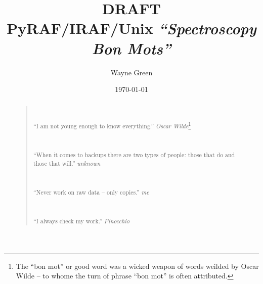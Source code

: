 \documentclass[letter,11pt,oneside]{article}
\begin{document}

\pagecolor{yellow}

\title{\vspace{2.5cm}
{\huge DRAFT} \\
PyRAF/IRAF/Unix \emph{``Spectroscopy Bon Mots''}\\
{\color{darkred}{Now! With Community 2.17 and PyRAF 3}}}
\author{\vspace{-0.5cm} Wayne Green}
\date{\vspace{-0.5cm} \today}
\maketitle


\begin{abstract}
{\color{darkgreen}
\begin{quote}
~


``I am not young enough to know everything.'' {\small \emph{Oscar
    Wilde}\footnote{The ``bon mot'' or good word was a wicked weapon
of words weilded by Oscar Wilde -- to whome the turn of phrase ``bon
mot'' is often attributed.}}

~

``When it comes to backups there are two types of people: those that do
and those that will.'' {\small \emph{unknown}}

~

``Never work on raw data -- only copies.'' {\small \emph{me}}

~

``I always check my work.'' {\small \emph{Pinocchio}}
\end{quote}
}
\end{abstract}
\clearpage
\pagecolor{white}





\tableofcontents \label{sec:contents}
\listoftables

\clearpage
\end{document}

